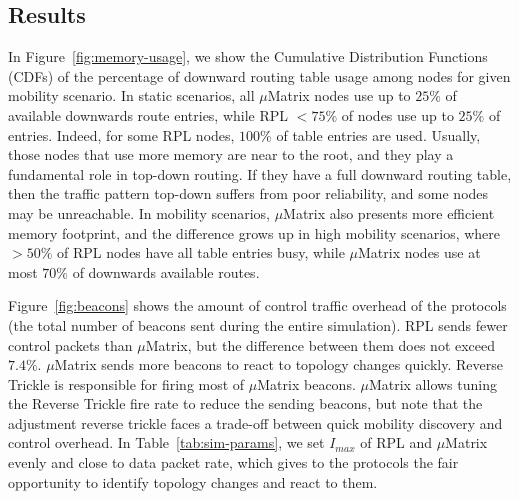 \subsection{Results}

In Figure~\ref{fig:memory-usage}, we show the Cumulative Distribution Functions (CDFs) of the percentage of downward routing table usage among nodes for given mobility scenario. In static scenarios, all $\mu$Matrix nodes use up to $25\%$ of available downwards route entries, while RPL $< 75\%$ of nodes use up to $25\%$ of entries. Indeed, for some RPL nodes, $100\%$ of table entries are used. Usually, those nodes that use more memory are near to the root, and they play a fundamental role in top-down routing. If they have a full downward routing table, then the traffic pattern top-down suffers from poor reliability, and some nodes may be unreachable. In mobility scenarios, $\mu$Matrix also presents more efficient memory footprint, and the difference grows up in high mobility scenarios, where $>50\%$ of RPL nodes have all table entries busy, while $\mu$Matrix nodes use at most $70\%$ of downwards available routes.

Figure~\ref{fig:beacons} shows the amount of control traffic overhead of the protocols (the total number of beacons sent during the entire simulation). RPL sends fewer control packets than $\mu$Matrix, but the difference between them does not exceed $7.4\%$. $\mu$Matrix sends more beacons to react to topology changes quickly. Reverse Trickle is responsible for firing most of $\mu$Matrix beacons. $\mu$Matrix allows tuning the Reverse Trickle fire rate to reduce the sending beacons, but note that the adjustment reverse trickle faces a  trade-off between quick mobility discovery and control overhead. In Table~\ref{tab:sim-params}, we set $I_{max}$ of RPL and $\mu$Matrix evenly and close to data packet rate, which gives to the protocols the fair opportunity to identify topology changes and react to them.

